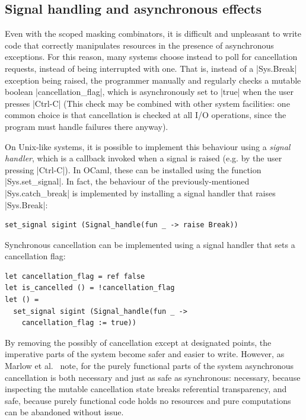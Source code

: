 \documentclass{llncs}
\begin{document}

\subsection{Signal handling and asynchronous effects}
\label{sec:signals}

Even with the scoped masking combinators, it is difficult and
unpleasant to write code that correctly manipulates resources in the
presence of asynchronous exceptions. For this reason, many systems
choose instead to poll for cancellation requests, instead of being
interrupted with one. That is, instead of a |Sys.Break| exception
being raised, the programmer manually and regularly checks a mutable
boolean |cancellation_flag|, which is asynchronously set to |true|
when the user presses |Ctrl-C| (This check may be combined with other
system facilities: one common choice is that cancellation is checked
at all I/O operations, since the program must handle failures there
anyway).

On Unix-like systems, it is possible to implement this behaviour using
a \emph{signal handler}, which is a callback invoked when a signal is
raised (e.g. by the user pressing |Ctrl-C|). In OCaml, these can
be installed using the function |Sys.set_signal|. In fact, the
behaviour of the previously-mentioned |Sys.catch_break| is
implemented by installing a signal handler that raises |Sys.Break|:
\begin{lstlisting}
set_signal sigint (Signal_handle(fun _ -> raise Break))
\end{lstlisting}
Synchronous cancellation can be implemented using a signal handler
that sets a cancellation flag:
\begin{lstlisting}
let cancellation_flag = ref false
let is_cancelled () = !cancellation_flag
let () =
  set_signal sigint (Signal_handle(fun _ ->
    cancellation_flag := true))
\end{lstlisting}

By removing the possibly of cancellation except at designated points,
the imperative parts of the system become safer and easier to write. However, as
Marlow et al.~\citep*{Marlow2001async} note, for the purely functional parts of the
system asynchronous cancellation is both necessary and just as safe as synchronous:
necessary, because inspecting the mutable cancellation state breaks
referential transparency, and safe, because purely functional code
holds no resources and pure computations can be abandoned without issue.
\end{document}
